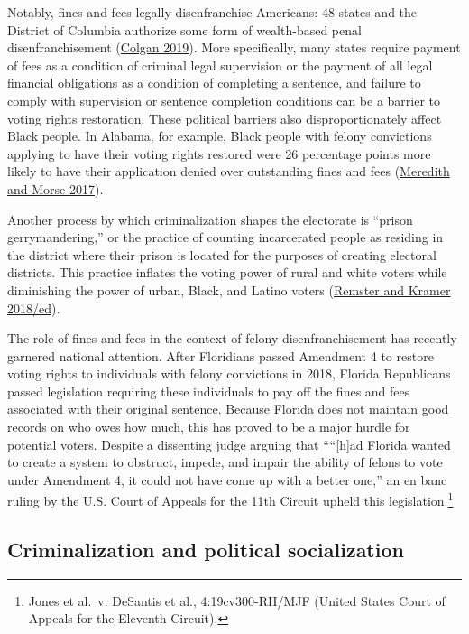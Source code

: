 \documentclass[
  12pt,
]{article}
\begin{document}
Notably, fines and fees legally disenfranchise Americans: 48 states and the District of Columbia authorize some form of wealth-based penal disenfranchisement (\protect\hyperlink{ref-Colgan2019}{Colgan 2019}). More specifically, many states require payment of fees as a condition of criminal legal supervision or the payment of all legal financial obligations as a condition of completing a sentence, and failure to comply with supervision or sentence completion conditions can be a barrier to voting rights restoration. These political barriers also disproportionately affect Black people. In Alabama, for example, Black people with felony convictions applying to have their voting rights restored were 26 percentage points more likely to have their application denied over outstanding fines and fees (\protect\hyperlink{ref-Meredith2017}{Meredith and Morse 2017}).

Another process by which criminalization shapes the electorate is ``prison gerrymandering,'' or the practice of counting incarcerated people as residing in the district where their prison is located for the purposes of creating electoral districts. This practice inflates the voting power of rural and white voters while diminishing the power of urban, Black, and Latino voters (\protect\hyperlink{ref-Remster2018}{Remster and Kramer 2018/ed}).

The role of fines and fees in the context of felony disenfranchisement has recently garnered national attention. After Floridians passed Amendment 4 to restore voting rights to individuals with felony convictions in 2018, Florida Republicans passed legislation requiring these individuals to pay off the fines and fees associated with their original sentence. Because Florida does not maintain good records on who owes how much, this has proved to be a major hurdle for potential voters. Despite a dissenting judge arguing that ````{[}h{]}ad Florida wanted to create a system to obstruct, impede, and impair the ability of felons to vote under Amendment 4, it could not have come up with a better one,'' an en banc ruling by the U.S. Court of Appeals for the 11th Circuit upheld this legislation.\footnote{Jones et al.~v. DeSantis et al., 4:19cv300-RH/MJF (United States Court of Appeals for the Eleventh Circuit).}

\hypertarget{criminalization-and-political-socialization}{%
\subsection*{Criminalization and political socialization}\label{criminalization-and-political-socialization}}
\end{document}
